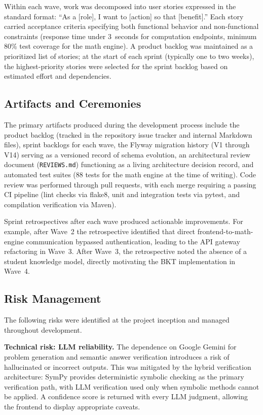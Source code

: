 Within each wave, work was decomposed into user stories expressed in the standard format: ``As a [role], I want to [action] so that [benefit].'' Each story carried acceptance criteria specifying both functional behavior and non-functional constraints (response time under 3~seconds for computation endpoints, minimum 80\% test coverage for the math engine). A product backlog was maintained as a prioritized list of stories; at the start of each sprint (typically one to two weeks), the highest-priority stories were selected for the sprint backlog based on estimated effort and dependencies.

\subsection{Artifacts and Ceremonies}
\label{subsec:artifacts}

The primary artifacts produced during the development process include the product backlog (tracked in the repository issue tracker and internal Markdown files), sprint backlogs for each wave, the Flyway migration history (V1 through V14) serving as a versioned record of schema evolution, an architectural review document (\texttt{REVIEWS.md}) functioning as a living architecture decision record, and automated test suites (88 tests for the math engine at the time of writing). Code review was performed through pull requests, with each merge requiring a passing CI pipeline (lint checks via flake8, unit and integration tests via pytest, and compilation verification via Maven).

Sprint retrospectives after each wave produced actionable improvements. For example, after Wave~2 the retrospective identified that direct frontend-to-math-engine communication bypassed authentication, leading to the API gateway refactoring in Wave~3. After Wave~3, the retrospective noted the absence of a student knowledge model, directly motivating the BKT implementation in Wave~4.

\subsection{Risk Management}
\label{subsec:risks}

The following risks were identified at the project inception and managed throughout development.

\textbf{Technical risk: LLM reliability.} The dependence on Google Gemini for problem generation and semantic answer verification introduces a risk of hallucinated or incorrect outputs. This was mitigated by the hybrid verification architecture: SymPy provides deterministic symbolic checking as the primary verification path, with LLM verification used only when symbolic methods cannot be applied. A confidence score is returned with every LLM judgment, allowing the frontend to display appropriate caveats.

